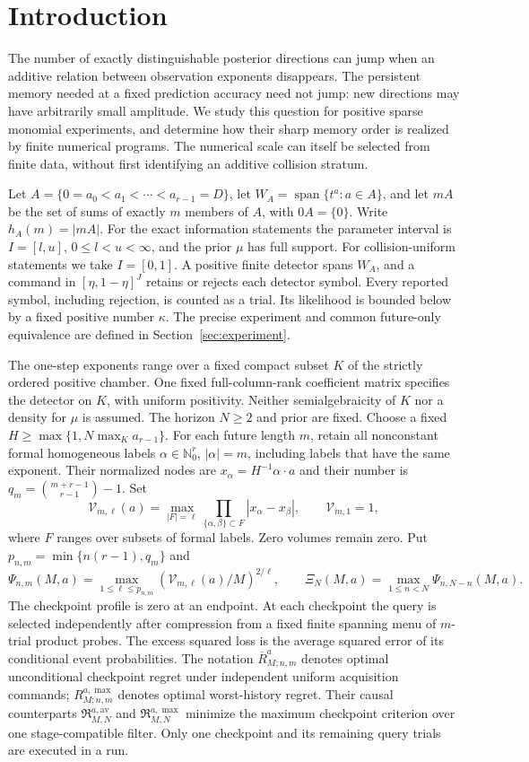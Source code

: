 \section{Introduction}
The number of exactly distinguishable posterior directions can jump when
an additive relation between observation exponents disappears. The
persistent memory needed at a fixed prediction accuracy need not jump:
new directions may have arbitrarily small amplitude. We study this
question for positive sparse monomial experiments, and determine how their sharp memory order is realized by finite
numerical programs. The numerical scale can itself be selected from
finite data, without first identifying an additive collision stratum.

Let $A=\{0=a_0<a_1<\cdots<a_{r-1}=D\}$, let
$W_A=\operatorname{span}\{t^a:a\in A\}$, and let $mA$ be the
set of sums of exactly $m$ members of $A$, with $0A=\{0\}$.
Write $h_A(m)=|mA|$. For the exact information statements the parameter
interval is $I=[l,u]$, $0\le l<u<\infty$, and the prior $\mu$ has
full support. For collision-uniform statements we take $I=[0,1]$.
A positive finite detector spans $W_A$, and a command in
$[\eta,1-\eta]^J$ retains or rejects each detector symbol. Every
reported symbol, including rejection, is counted as a trial. Its
likelihood is bounded below by a fixed positive number $\kappa$.
The precise experiment and common future-only equivalence are defined
in Section~\ref{sec:experiment}.

The one-step exponents range over a fixed compact subset $K$ of the
strictly ordered positive chamber. One fixed full-column-rank coefficient
matrix specifies the detector on $K$, with uniform positivity. Neither
semialgebraicity of $K$ nor a density for $\mu$ is assumed. The horizon
$N\ge2$ and prior are fixed. Choose a fixed
$H\ge\max\{1,N\max_Ka_{r-1}\}$. For each future length $m$, retain
all nonconstant formal homogeneous labels $\alpha\in\mathbb N_0^r$,
$|\alpha|=m$, including labels that have the same exponent. Their
normalized nodes are $x_\alpha=H^{-1}\alpha\cdot a$ and their number
is $q_m=\binom{m+r-1}{r-1}-1$. Set
\[
 \mathcal V_{m,\ell}(a)=\max_{|F|=\ell}
         \prod_{\{\alpha,\beta\}\subset F}|x_\alpha-x_\beta|,
 \qquad \mathcal V_{m,1}=1,
\]
where $F$ ranges over subsets of formal labels. Zero volumes remain
zero. Put $p_{n,m}=\min\{n(r-1),q_m\}$ and
\[
 \Psi_{n,m}(M,a)=\max_{1\le\ell\le p_{n,m}}
           (\mathcal V_{m,\ell}(a)/M)^{2/\ell},\qquad
 \Xi_N(M,a)=\max_{1\le n<N}\Psi_{n,N-n}(M,a).
\]
The checkpoint profile is zero at an endpoint. At each checkpoint the
query is selected independently after compression from a fixed finite
spanning menu of $m$-trial product probes. The excess squared loss is
the average squared error of its conditional event probabilities.
The notation $\overline R_{M;n,m}^a$ denotes optimal unconditional
checkpoint regret under independent uniform acquisition commands;
$R_{M;n,m}^{a,\max}$ denotes optimal worst-history regret.
Their causal counterparts $\mathfrak R^{a,\mathrm{av}}_{M,N}$ and
$\mathfrak R^{a,\max}_{M,N}$ minimize the maximum checkpoint criterion
over one stage-compatible filter. Only one checkpoint and its remaining
query trials are executed in a run.

